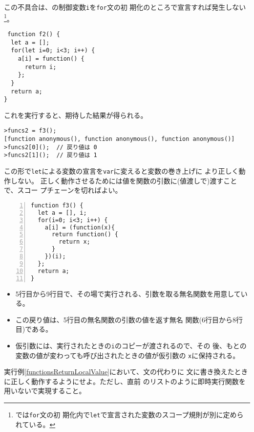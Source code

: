 \begin{Exec}\upshape\label{declareVariableInFor}
この不具合は、の制御変数\Verb+i+を\Verb+for+文の初
 期化のところで宣言すれば発生しない\footnote{\ES では\texttt{for}文の初
 期化内で\texttt{let}で宣言された変数のスコープ規則が別に定められている。}。
\begin{Verbatim}
 function f2() {
  let a = [];
  for(let i=0; i<3; i++) {
    a[i] = function() {
      return i;
    };
  }
  return a;
}
\end{Verbatim}
これを実行すると、期待した結果が得られる。
\begin{Verbatim}
>funcs2 = f3();
[function anonymous(), function anonymous(), function anonymous()]
>funcs2[0]();  // 戻り値は 0
>funcs2[1]();  // 戻り値は 1
\end{Verbatim}

この形で\Verb+let+による変数の宣言を\Verb+var+に変えると変数の巻き上げに
 より正しく動作しない。
%
正しく動作させるためには値を関数の引数に(値渡しで)渡すことで、スコー
 プチェーンを切ればよい。
 \begin{Verbatim}[numbers=left]
function f3() {
  let a = [], i;
  for(i=0; i<3; i++) {
    a[i] = (function(x){
      return function() {
        return x;
      }
    })(i);
  };
  return a;
}
 \end{Verbatim}
\begin{itemize}
 \item 5行目から9行目で、その場で実行される、引数を取る無名関数を用意している。
 \item この戻り値は、5行目の無名関数の引数の値を返す無名
       関数(6行目から8行目)である。
 \item 仮引数には、実行されたときの\Verb+i+のコピーが渡されるので、その
       後、もとの変数の値が変わっても呼び出されたときの値が仮引数の
       \texttt{x}に保持される。
\end{itemize}
\end{Exec}
\begin{Prob}\upshape
 実行例\ref{functionsReturnLocalValue}において、文の代わりに
 文に書き換えたときに正しく動作するようにせよ。ただし、直前
 のリストのように即時実行関数を用いないで実現すること。
\end{Prob}
